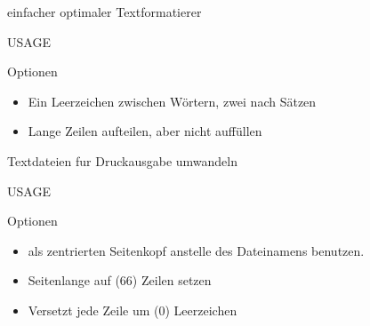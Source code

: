 \documentclass[aspectratio=43]{beamer}
\begin{document}
\begin{frame} 
	\begin{block}{} 
        einfacher optimaler Textformatierer
	\end{block}
	\begin{block}{USAGE} 
	\end{block}
	\begin{exampleblock}{Optionen} 
	\begin{itemize}
	\item {} Ein Leerzeichen zwischen Wörtern, zwei nach Sätzen
	\item {} Lange Zeilen aufteilen, aber nicht auffüllen
	\end{itemize}
	
	\end{exampleblock}
\end{frame}

\begin{frame} 
	\begin{block}{} 
        Textdateien fur Druckausgabe umwandeln
	\end{block}
	\begin{block}{USAGE} 
	\end{block}
	\begin{exampleblock}{Optionen} 
	\begin{itemize}
	\item {}      als   zentrierten  Seitenkopf  anstelle  des  Dateinamens   benutzen. 
	\item {} Seitenlange auf   (66)  Zeilen  setzen  
	\item {} Versetzt  jede  Zeile  um    (0) Leerzeichen
	\end{itemize}
	
	\end{exampleblock}
\end{frame}
\end{document}
